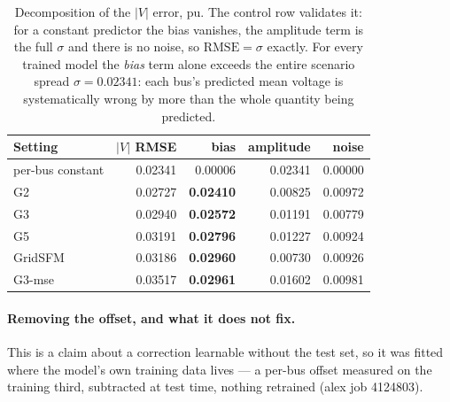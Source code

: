 \documentclass[10pt]{article}
\begin{document}
\begin{table}[H]
\centering\footnotesize
\begin{tabular}{lrrrr}
\toprule
Setting & $|V|$ RMSE & bias & amplitude & noise\\
\midrule
per-bus constant & 0.02341 & 0.00006 & 0.02341 & 0.00000\\
\midrule
G2 & 0.02727 & \textbf{0.02410} & 0.00825 & 0.00972\\
G3 & 0.02940 & \textbf{0.02572} & 0.01191 & 0.00779\\
G5 & 0.03191 & \textbf{0.02796} & 0.01227 & 0.00924\\
GridSFM & 0.03186 & \textbf{0.02960} & 0.00730 & 0.00926\\
G3-mse & 0.03517 & \textbf{0.02961} & 0.01602 & 0.00981\\
\bottomrule
\end{tabular}
\caption{Decomposition of the $|V|$ error, pu.  The control row validates it:
for a constant predictor the bias vanishes, the amplitude term is the full
$\sigma$ and there is no noise, so $\mathrm{RMSE}=\sigma$ exactly.  For every
trained model the \emph{bias} term alone exceeds the entire scenario spread
$\sigma=0.02341$: each bus's predicted mean voltage is systematically wrong by
more than the whole quantity being predicted.}
\end{table}

\paragraph{Removing the offset, and what it does not fix.}  This is a claim
about a correction learnable without the test set, so it was fitted where the
model's own training data lives --- a per-bus offset measured on the training
third, subtracted at test time, nothing retrained (alex job 4124803).
\end{document}
